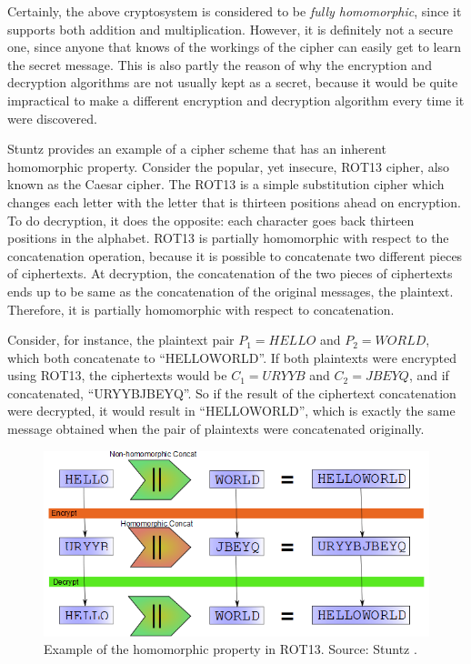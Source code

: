 Certainly, the above cryptosystem is considered to be \emph{fully homomorphic}, since it supports both addition and multiplication. However, it is definitely not a secure one, since anyone that knows of the workings of the cipher can easily get to learn the secret message. This is also partly the reason of why the encryption and decryption algorithms are not usually kept as a secret, because it would be quite impractical to make a different encryption and decryption algorithm every time it were discovered. 

Stuntz \cite{stuntz2010} provides an example of a cipher scheme that has an inherent homomorphic property. Consider the popular, yet insecure, ROT13 cipher, also known as the Caesar cipher. The ROT13 is a simple substitution cipher which changes each letter with the letter that is thirteen positions ahead on encryption. To do decryption, it does the opposite: each character goes back thirteen positions in the alphabet. 
ROT13 is partially homomorphic with respect to the concatenation operation, because it is possible to concatenate two different pieces of ciphertexts. At decryption, the concatenation of the two pieces of ciphertexts ends up to be same as the concatenation of the original messages, the plaintext. Therefore, it is partially homomorphic with respect to concatenation. 

Consider, for instance, the plaintext pair $P_{1}=HELLO$ and $P_{2}=WORLD$, which both concatenate to ``HELLOWORLD''. If both plaintexts were encrypted using ROT13, the ciphertexts would be $C_{1}=URYYB$ and $C_{2}=JBEYQ$, and if concatenated, ``URYYBJBEYQ''. So if the result of the ciphertext concatenation were decrypted, it would result in ``HELLOWORLD'', which is exactly the same message obtained when the pair of plaintexts were concatenated originally.

\begin{figure}[H]
  \centerline{\includegraphics[scale=0.5]{img/rot13homo}}
  \caption[Example of the homomorphic property in ROT13]{Example of the homomorphic property in ROT13. Source: Stuntz \cite{stuntz2010}.}
\end{figure}

